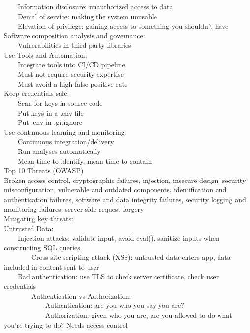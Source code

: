 \documentclass[10pt,letterpaper,unboxed,cm]{article}
\newcommand{\tab}{~~~~}
\begin{document}
\tab Information disclosure: unauthorized access to data\\
\tab Denial of service: making the system unusable\\
\tab Elevation of privilege: gaining access to something you shouldn't have\\
Software composition analysis and governance:\\
\tab Vulnerabilities in third-party libraries\\
Use Tools and Automation: \\
\tab Integrate tools into CI/CD pipeline\\
\tab Must not require security expertise\\
\tab Must avoid a high false-positive rate\\
Keep credentials safe: \\
\tab Scan for keys in source code\\
\tab Put keys in a .env file\\
\tab Put .env in .gitignore\\
Use continuous learning and monitoring: \\
\tab Continuous integration/delivery\\
\tab Run analyses automatically\\
\tab Mean time to identify, mean time to contain\\
Top 10 Threats (OWASP)\\
Broken access control, cryptographic failures, injection, insecure design, security misconfiguration, vulnerable and outdated components, 
identification and authentication failures, software and data integrity failures, security logging and monitoring failures, server-side request forgery\\
Mitigating key threats: \\
Untrusted Data: \\
\tab Injection attacks: validate input, avoid eval(), sanitize inputs when constructing SQL queries\\
\tab \tab Cross site scripting attack (XSS): untrusted data enters app, data included in content sent to user\\
\tab Bad authentication: use TLS to check server certificate, check user credentials\\
\tab \tab Authentication vs Authorization: \\
\tab \tab \tab Authentication: are you who you say you are?\\
\tab \tab \tab Authorization: given who you are, are you allowed to do what you're trying to do? Needs access control\\
\end{document}
